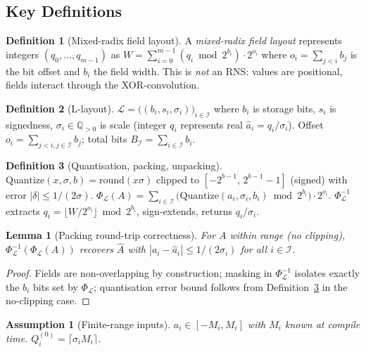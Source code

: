\documentclass[11pt,a4paper]{article}
\theoremstyle{definition}
\newtheorem{definition}{Definition}[section]
\theoremstyle{plain}
\newtheorem{lemma}{Lemma}[section]
\newtheorem{assumption}{Assumption}[section]
\theoremstyle{remark}
\newcommand{\Quantize}{\mathrm{Quantize}}
\newcommand{\Pack}{\Phi_{\mathcal{L}}}
\newcommand{\Unpack}{\Phi^{-1}_{\mathcal{L}}}
\begin{document}
\subsection{Key Definitions}

\begin{definition}[Mixed-radix field layout]
\label{def:mixed-radix}
A \emph{mixed-radix field layout} represents integers $(q_0,\ldots,q_{m-1})$
as $W = \sum_{i=0}^{m-1}(q_i \bmod 2^{b_i})\cdot 2^{o_i}$ where
$o_i = \sum_{j<i}b_j$ is the bit offset and $b_i$ the field width.
This is \emph{not} an RNS: values are positional, fields interact
through the XOR-convolution.
\end{definition}

\begin{definition}[L-layout]
\label{def:layout}
$\mathcal{L} = \bigl((b_i, s_i, \sigma_i)\bigr)_{i\in\mathcal{I}}$
where $b_i$ is storage bits, $s_i$ is signedness, $\sigma_i\in\mathbb{Q}_{>0}$
is scale (integer $q_i$ represents real $\hat{a}_i = q_i/\sigma_i$).
Offset $o_i = \sum_{j<i,j\in\mathcal{I}}b_j$; total bits $B_\mathcal{I}=\sum_{i\in\mathcal{I}}b_i$.
\end{definition}

\begin{definition}[Quantisation, packing, unpacking]
\label{def:quantize}
$\Quantize(x,\sigma,b) = \mathrm{round}(x\sigma)$ clipped to
$[-2^{b-1},\,2^{b-1}-1]$ (signed) with error $|\delta|\le 1/(2\sigma)$.
$\Pack(A) = \sum_{i\in\mathcal{I}}\bigl(\Quantize(a_i,\sigma_i,b_i)\bmod 2^{b_i}\bigr)\cdot 2^{o_i}$.
$\Unpack$ extracts $q_i = \lfloor W/2^{o_i}\rfloor\bmod 2^{b_i}$,
sign-extends, returns $q_i/\sigma_i$.
\end{definition}

\begin{lemma}[Packing round-trip correctness]
\label{lem:pack}
For $A$ within range (no clipping), $\Unpack(\Pack(A))$ recovers
$\hat{A}$ with $|a_i - \hat{a}_i|\le 1/(2\sigma_i)$ for all $i\in\mathcal{I}$.
\end{lemma}
\begin{proof}
Fields are non-overlapping by construction; masking in $\Unpack$
isolates exactly the $b_i$ bits set by $\Pack$; quantisation error
bound follows from Definition~\ref{def:quantize} in the no-clipping case.
\end{proof}

\begin{assumption}[Finite-range inputs]
\label{ass:range}
$a_i\in[-M_i,M_i]$ with $M_i$ known at compile time.
$Q_i^{(0)} = \lceil\sigma_i M_i\rceil$.
\end{assumption}
\end{document}
